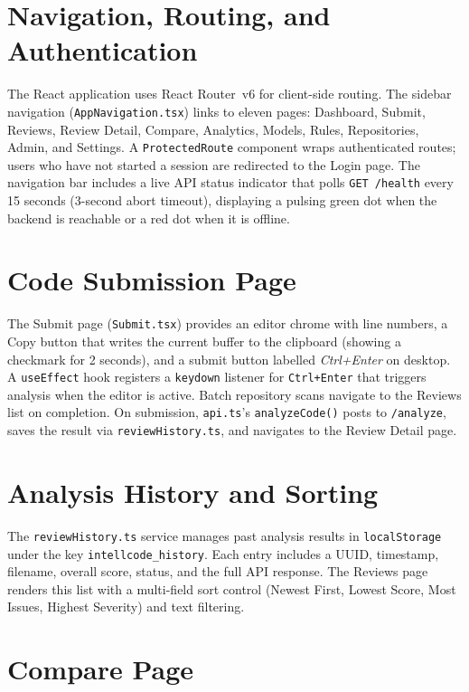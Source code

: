 \documentclass[12pt, oneside]{report}
\begin{document}
\section{Navigation, Routing, and Authentication}

The React application uses React Router~v6 for client-side routing. The sidebar
navigation (\texttt{AppNavigation.tsx}) links to eleven pages: Dashboard, Submit,
Reviews, Review Detail, Compare, Analytics, Models, Rules, Repositories, Admin, and
Settings. A \texttt{ProtectedRoute} component wraps authenticated routes; users who
have not started a session are redirected to the Login page. The navigation bar
includes a live API status indicator that polls \texttt{GET /health} every 15 seconds
(3-second abort timeout), displaying a pulsing green dot when the backend is reachable
or a red dot when it is offline.

\section{Code Submission Page}

The Submit page (\texttt{Submit.tsx}) provides an editor chrome with line numbers, a
Copy button that writes the current buffer to the clipboard (showing a checkmark for
2 seconds), and a submit button labelled \textit{Ctrl+Enter} on desktop. A
\texttt{useEffect} hook registers a \texttt{keydown} listener for \texttt{Ctrl+Enter}
that triggers analysis when the editor is active. Batch repository scans navigate to
the Reviews list on completion. On submission, \texttt{api.ts}'s \texttt{analyzeCode()}
posts to \texttt{/analyze}, saves the result via \texttt{reviewHistory.ts}, and navigates
to the Review Detail page.

\section{Analysis History and Sorting}

The \texttt{reviewHistory.ts} service manages past analysis results in
\texttt{localStorage} under the key \texttt{intellcode\_history}. Each entry includes
a UUID, timestamp, filename, overall score, status, and the full API response. The
Reviews page renders this list with a multi-field sort control (Newest First, Lowest
Score, Most Issues, Highest Severity) and text filtering.

\section{Compare Page}
\end{document}
